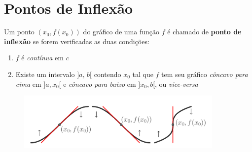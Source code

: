 \section{Pontos de Inflexão}

\begin{frame}
  \begin{definition}
    Um  ponto $(x_{0},f(x_{0}))$ do gráfico de uma função $f$ é chamado de \textbf{ponto de inflexão} se forem verificadas as duas condições:
    \begin{enumerate}
      \item $f$ é \emph{contínua} em $c$
      \item Existe um intervalo $]a,\,b[$ contendo $x_{0}$ tal que $f$ tem seu gráfico \emph{côncavo para cima} em $]a,x_{0}[$ e \emph{côncavo para baixo} em $]x_{0},b[$, ou \emph{vice-versa}
    \end{enumerate}
  \end{definition}
  \begin{figure}
    \includegraphics[width=0.9\textwidth]{figuras/figura3.pdf}
  \end{figure}
\end{frame}

